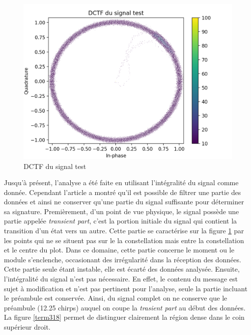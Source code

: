 \begin{figure}[h]
\centering

\includegraphics[scale=0.18]{images/dctf4.png}
\caption{DCTF du signal test}\label{term317}
\end{figure}

Jusqu'à présent, l'analyse a été faite en utilisant l'intégralité du signal comme donnée. Cependant l'article \cite{loraDTCF} a montré qu'il est possible de filtrer une partie des données et ainsi ne conserver qu'une partie du signal suffisante pour déterminer sa signature. Premièrement, d'un point de vue physique, le signal possède une partie appelée \textit{transient part}, c'est la portion initiale du signal qui contient la transition d'un état vers un autre. Cette partie se caractérise sur la figure \ref{term317} par les points qui ne se situent pas sur le la constellation mais entre la constellation et le centre du plot. Dans ce domaine, cette partie concerne le moment ou le module s'enclenche, occasionant des irrégularité dans la réception des données. Cette partie seule étant instable, elle est écarté des données analysée. Ensuite, l'intégralité du signal n'est pas nécessaire. En effet, le contenu du message est sujet à modification  et n'est pas pertinent pour l'analyse, seule la partie incluant le préambule est conservée. Ainsi, du signal complet on ne conserve que le préambule (12.25 chirps) auquel on coupe la \textit{trasient part} au début des données. La figure \ref{term318} permet de distinguer clairement la région dense dans le coin supérieur droit.

